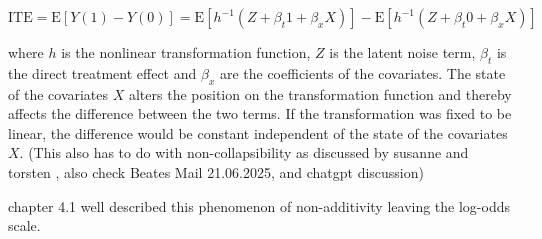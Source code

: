 \begin{equation}
\text{ITE} = \text{E}[Y(1) - Y(0)] = \text{E}[h^{-1}(Z + \beta_t 1 + \beta_x X)] - \text{E}[h^{-1}(Z + \beta_t 0 + \beta_x X)] 
\end{equation}

where $h$ is the nonlinear transformation function, $Z$ is the latent noise term, $\beta_t$ is the direct treatment effect and $\beta_x$ are the coefficients of the covariates. The state of the covariates $X$ alters the position on the transformation function and thereby affects the difference between the two terms. If the transformation was fixed to be linear, the difference would be constant independent of the state of the covariates $X$. (This also has to do with non-collapsibility as discussed by susanne and torsten , also check Beates Mail 21.06.2025, and chatgpt discussion)

\citep{hoogland2021} chapter 4.1 well described this phenomenon of non-additivity leaving the log-odds scale.





